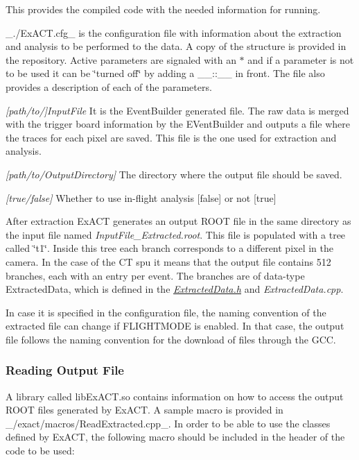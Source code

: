 This provides the compiled code with the needed information for running.

\+\_\+./\+Ex\+A\+CT.cfg\+\_\+ is the configuration file with information about the extraction and analysis to be performed to the data. A copy of the structure is provided in the repository. Active parameters are signaled with an {\bfseries $\ast$} and if a parameter is not to be used it can be \char`\"{}turned off\char`\"{} by adding a \+\_\+\+\_\+\+::\+\_\+\+\_\+ in front. The file also provides a description of each of the parameters.

{\itshape \mbox{[}path/to/\mbox{]}Input\+File} It is the Event\+Builder generated file. The raw data is merged with the trigger board information by the E\+Vent\+Builder and outputs a file where the traces for each pixel are saved. This file is the one used for extraction and analysis.

{\itshape \mbox{[}path/to/\+Output\+Directory\mbox{]}} The directory where the output file should be saved.

{\itshape \mbox{[}true/false\mbox{]}} Whether to use in-\/flight analysis \mbox{[}false\mbox{]} or not \mbox{[}true\mbox{]}

After extraction Ex\+A\+CT generates an output R\+O\+OT file in the same directory as the input file named {\itshape Input\+File\+\_\+\+Extracted.\+root}. This file is populated with a tree called \char`\"{}t1\char`\"{}. Inside this tree each branch corresponds to a different pixel in the camera. In the case of the CT spu it means that the output file contains 512 branches, each with an entry per event. The branches are of data-\/type Extracted\+Data, which is defined in the {\itshape \hyperlink{ExtractedData_8h_source}{Extracted\+Data.\+h}} and {\itshape Extracted\+Data.\+cpp}.

In case it is specified in the configuration file, the naming convention of the extracted file can change if F\+L\+I\+G\+H\+T\+M\+O\+DE is enabled. In that case, the output file follows the naming convention for the download of files through the G\+CC.

\subsubsection*{Reading Output File}

A library called lib\+Ex\+A\+C\+T.\+so contains information on how to access the output R\+O\+OT files generated by Ex\+A\+CT. A sample macro is provided in \+\_\+/exact/macros/\+Read\+Extracted.\+cpp\+\_\+. In order to be able to use the classes defined by Ex\+A\+CT, the following macro should be included in the header of the code to be used\+:


